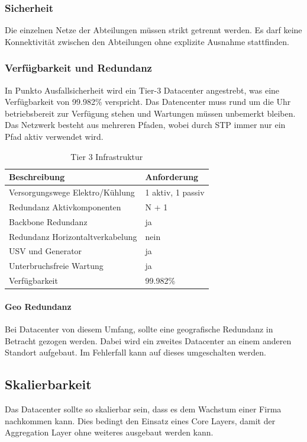 \subsubsection{Sicherheit}
Die einzelnen Netze der Abteilungen müssen strikt getrennt werden. Es darf keine Konnektivität zwischen den Abteilungen ohne explizite Ausnahme stattfinden.

\subsubsection{Verfügbarkeit und Redundanz}
In Punkto Ausfallsicherheit wird ein Tier-3 Datacenter angestrebt, was eine Verfügbarkeit von 99.982\% verspricht. Das Datencenter muss rund um die Uhr betriebsbereit zur Verfügung stehen und Wartungen müssen unbemerkt bleiben. Das Netzwerk besteht aus mehreren Pfaden, wobei durch STP immer nur ein Pfad aktiv verwendet wird.  
\begin{table}[h]
	\centering
	\begin{tabu}{l l}
		\toprule
		Beschreibung & Anforderung \\
		\midrule
		Versorgungswege Elektro/Kühlung & 1 aktiv, 1 passiv \\
		Redundanz Aktivkomponenten & N + 1 \\
		Backbone Redundanz & ja\\
		Redundanz Horizontaltverkabelung & nein\\
		USV und Generator & ja\\
		Unterbruchsfreie Wartung & ja\\
		Verfügbarkeit & 99.982\% \\
		\bottomrule
	\end{tabu}
	\caption{Tier 3 Infrastruktur}
\end{table}

\paragraph{Geo Redundanz}
Bei Datacenter von diesem Umfang, sollte eine geografische Redundanz in Betracht gezogen werden. Dabei wird ein zweites Datacenter an einem anderen Standort aufgebaut. Im Fehlerfall kann auf dieses umgeschalten werden. 

\subsection{Skalierbarkeit}
Das Datacenter sollte so skalierbar sein, dass es dem Wachstum einer Firma nachkommen kann. Dies bedingt den Einsatz eines Core Layers, damit der Aggregation Layer ohne weiteres ausgebaut werden kann.

